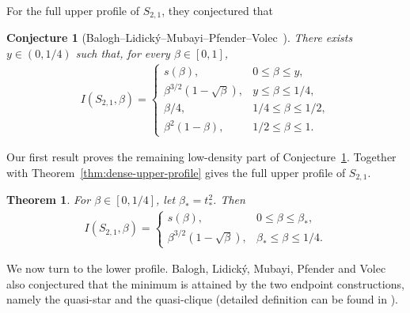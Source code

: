 \documentclass[10pt,a4paper]{article}
\newtheorem{theorem}[definition]{Theorem}
\newtheorem{conjecture}[definition]{Conjecture}
\begin{document}
For the full upper profile of $S_{2,1}$,   they \cite{BLMPV} conjectured that 

\begin{conjecture}[Balogh--Lidick\'y--Mubayi--Pfender--Volec~\cite{BLMPV}]\label{conj:upper-profile}
 There exists $y \in (0,1/4)$ such that, for every $\beta\in[0,1]$,
\begin{align*}
        I(S_{2,1},\beta)=
        \begin{cases}
        s(\beta), & 0\le \beta\le y,\\[1mm]
        \beta^{3/2}(1-\sqrt{\beta}), & y\le \beta\le 1/4,\\[1mm]
        \beta/4, & 1/4\le \beta\le 1/2,\\[1mm]
        \beta^2(1-\beta), & 1/2\le \beta\le 1. 
        \end{cases}
\end{align*}


\end{conjecture}


Our first result proves the remaining low-density part of Conjecture~\ref{conj:upper-profile}. Together with Theorem~\ref{thm:dense-upper-profile}  gives the full upper profile of $S_{2,1}$.
\begin{theorem}\label{thm:upper-profile}
For $\beta\in[0,1/4]$, let $\beta_*=t_*^2$. Then 
\begin{align*}
        I(S_{2,1},\beta)=
        \begin{cases}
        s(\beta), & 0\le \beta\le \beta_*,\\[1mm]
        \beta^{3/2}(1-\sqrt{\beta}), & \beta_*\le \beta\le 1/4.
        \end{cases}
\end{align*}
\end{theorem}





We now turn to the lower profile. Balogh, Lidick\'y, Mubayi, Pfender and
Volec~\cite{BLMPV}  also conjectured that the minimum is attained by the two endpoint
constructions, namely the quasi-star and the quasi-clique (detailed definition can be found in \cite{BLMPV}).
\end{document}

